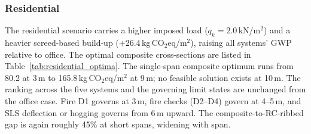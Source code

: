 \subsubsection{Residential}
\label{sec:res_residential}
The residential scenario carries a higher imposed load ($q_k = 2.0$\,kN/m$^2$) and a heavier screed-based build-up (+26.4\,kg\,CO$_2$eq/m$^2$), raising all systems' GWP relative to office. The optimal composite cross-sections are listed in Table~\ref{tab:residential_optima}. The single-span composite optimum runs from 80.2 at 3\,m to 165.8\,kg\,CO$_2$eq/m$^2$ at 9\,m; no feasible solution exists at 10\,m. The ranking across the five systems and the governing limit states are unchanged from the office case. Fire D1 governs at 3\,m, fire checks (D2--D4) govern at 4--5\,m, and SLS deflection or hogging governs from 6\,m upward. The composite-to-RC-ribbed gap is again roughly 45\% at short spans, widening with span.

